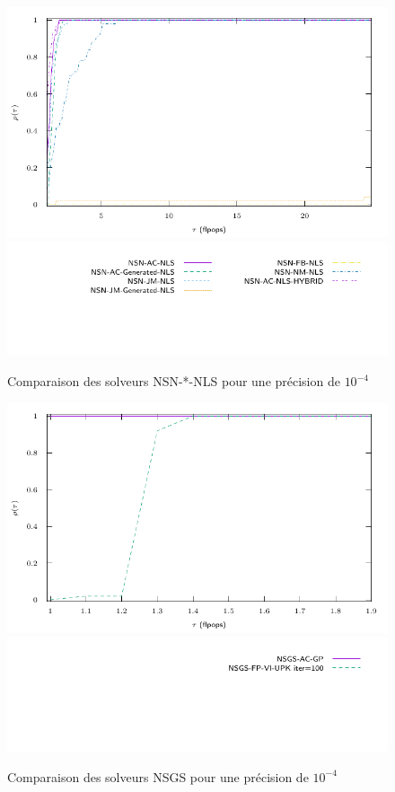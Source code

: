 \documentclass{CSMA2017}
\begin{document}
\begin{figure}
  \centering
  \includegraphics{figure/LowWall_FEM.1e-4.with_guess/nsn_nls/profile-LMGC_LowWall_FEM.pdf}
  \includegraphics{figure/LowWall_FEM.1e-4.with_guess/nsn_nls/profile-LMGC_LowWall_FEM_legend.pdf}
  \caption{Comparaison des solveurs NSN-*-NLS pour une précision de $10^{-4}$}
  \label{fig:LowWall_FEM.1e-4.nsn_nls}
\end{figure}
\begin{figure}
  \centering
  \includegraphics{figure/LowWall_FEM.1e-4.with_guess/nsgs/profile-LMGC_LowWall_FEM.pdf}
  \includegraphics{figure/LowWall_FEM.1e-4.with_guess/nsgs/profile-LMGC_LowWall_FEM_legend.pdf}
  \caption{Comparaison des solveurs NSGS pour une précision de $10^{-4}$}
  \label{fig:LowWall_FEM.1e-4.nsgs}
\end{figure}
\end{document}
